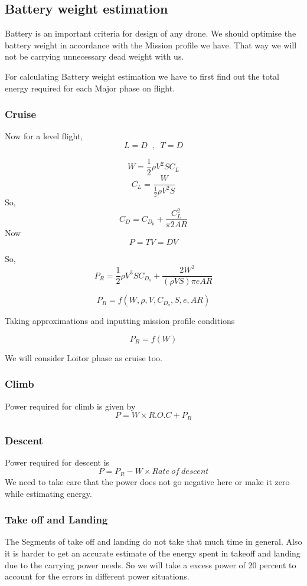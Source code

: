 \documentclass[12 pt]{article}
\begin{document}
\newpage

\subsection{Battery weight estimation}

Battery is an important criteria for design of any drone. We should optimise the battery weight in accordance with the Mission profile we have. That way we will not be carrying unnecessary dead weight with us.

For calculating Battery weight estimation we have to first find out the total energy required for each Major phase on flight.

\subsubsection{Cruise}
Now for a level flight,
$$ L = D \; \; , \; \; T = D$$

$$ W = \frac{1}{2} \rho V^2 S C_L $$
$$ C_L = \frac{W}{\frac{1}{2} \rho V^2 S}$$
So,
$$ C_D = C_{D_0} + \frac{C_L^2}{\pi 2 AR} $$
Now 
$$ P = TV = DV $$

So, 
$$ P_R = \frac{1}{2}\rho V^3 S C_{D_o} + \frac{2 W^2}{ (\rho V S) \pi e AR} $$

$$P_R = f(W,\rho,V,C_{D_o},S,e,AR)$$

Taking approximations and inputting mission profile conditions

$$ P_R = f(W) $$

We will consider Loitor phase as cruise too.

\subsubsection{Climb }
Power required for climb is given by 
$$ P = W \times R.O.C + P_R $$

\subsubsection{Descent}
Power required for descent is 
$$ P = P_R - W \times Rate\: of\: descent$$
We need to take care that the power does not go negative here or make it zero while estimating energy.

\subsubsection{Take off and Landing}
The Segments of take off and landing do not take that much time in general. Also it is harder to get an accurate estimate of the energy spent in takeoff and landing due to the carrying power needs. So we will take a excess power of 20 percent to account for the errors in different power situations.
\end{document}

